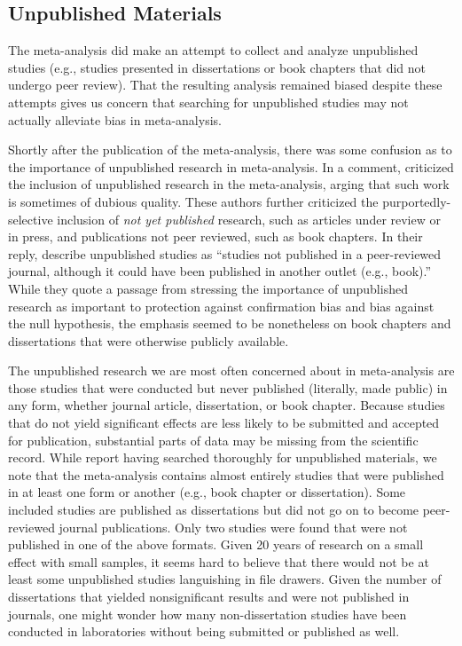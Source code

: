 \documentclass[man]{apa6}
\begin{document}
\subsection{Unpublished Materials}
The \citep{Anderson:etal:2010} meta-analysis did make an attempt to collect and analyze unpublished studies (e.g., studies presented in dissertations or book chapters that did not undergo peer review). That the resulting analysis remained biased despite these attempts gives us concern that searching for unpublished studies may not actually alleviate bias in meta-analysis. 

Shortly after the publication of the \citet{Anderson:etal:2010} meta-analysis, there was some confusion as to the importance of unpublished research in meta-analysis. In a comment, \citet{Ferguson:Kilburn:2010} %
criticized the inclusion of unpublished research in the meta-analysis, arging that such work is sometimes of dubious quality. These authors further criticized the purportedly-selective inclusion of {\em not yet published} research, such as articles under review or in press, and publications not peer reviewed, such as book chapters. In their reply, \citet{Bushman:etal:2010} describe unpublished studies as ``studies not published in a peer-reviewed journal, although it could have been published in another outlet (e.g., book).'' While they quote a passage from \citet{Cooper:2009} stressing the importance of unpublished research as important to protection against confirmation bias and bias against the null hypothesis, the emphasis seemed to be nonetheless on book chapters and dissertations that were otherwise publicly available.

The unpublished research we are most often concerned about in meta-analysis are those studies that were conducted but never published (literally, made public) in any form, whether journal article, dissertation, or book chapter. Because studies that do not yield significant effects are less likely to be submitted and accepted for publication, substantial parts of data may be missing from the scientific record. While \citet{Anderson:etal:2010} report having searched thoroughly for unpublished materials, we note that the meta-analysis contains almost entirely studies that were published in at least one form or another (e.g., book chapter or dissertation). Some included studies are published as dissertations but did not go on to become peer-reviewed journal publications. Only two studies were found that were not published in one of the above formats. Given 20 years of research on a small effect with small samples, it seems hard to believe that there would not be at least some unpublished studies languishing in file drawers. Given the number of dissertations that yielded nonsignificant results and were not published in journals, one might wonder how many non-dissertation studies have been conducted in laboratories without being submitted or published as well.
\end{document}
